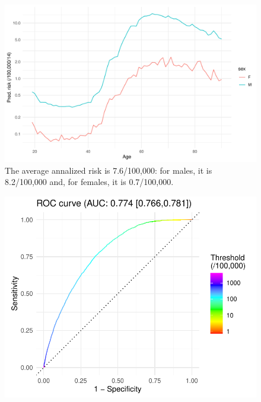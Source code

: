 \documentclass[12pt]{article}
\begin{document}
\begin{figure}[h]
\centering
\includegraphics[width=\textwidth]{figures/risk_age_sex14.pdf}
\caption{The average annalized risk is 7.6/100,000: for males, it is 8.2/100,000 and, for females, it is 0.7/100,000. }

\end{figure}



\begin{figure}[h]
\centering
\includegraphics[width=\textwidth]{figures/roc.pdf}

\end{figure}
\end{document}
